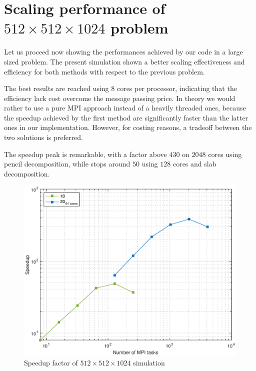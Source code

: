 \section{Scaling performance of $512\times 512\times 1024$ problem}
Let us proceed now showing the performances achieved by our code in a large sized problem.
The present simulation shown a better scaling effectiveness and efficiency for both methods with respect to the previous problem. 
\par
The best results are reached using 8 cores per processor, indicating that the efficiency lack cost overcome the message passing price.
In theory we would rather to use a pure MPI approach instead of a heavily threaded ones, because the speedup achieved by the first method are significantly faster than the latter ones in our implementation. However, for costing reasons, a tradeoff between the two solutions is preferred. \\
\par
The speedup peak is remarkable, with a factor above $430$ on $2048$ cores using pencil decomposition, while stops around $50$ using $128$ cores and slab decomposition. \\
\par


\begin{figure}
\begin{center}
\includegraphics[scale=0.55]{grafici/5122}
\caption{Speedup factor of $512\times 512\times 1024$ simulation}
\label{5122}
\end{center}
\end{figure}

